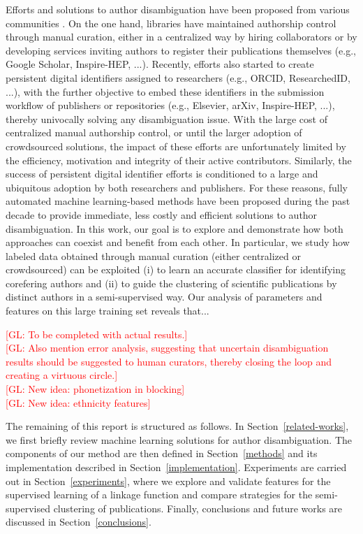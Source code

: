 \documentclass{article}
\newcommand{\glnote}[1]{\textcolor{red}{[GL: #1]}}
\begin{document}
Efforts and solutions to author disambiguation have been proposed from various
communities \citep{liu2014author}. On the one hand, libraries have maintained
authorship control through manual curation, either in a centralized way by
hiring collaborators or by developing services inviting authors to register
their publications themselves (e.g., Google Scholar, Inspire-HEP, ...).
Recently, efforts also started to create persistent digital identifiers
assigned to researchers (e.g., ORCID, ResearchedID, ...), with the further
objective to embed these identifiers in the submission workflow of publishers
or repositories (e.g., Elsevier, arXiv, Inspire-HEP, ...), thereby univocally
solving any disambiguation issue. With the large cost of centralized manual
authorship control, or until the larger adoption of crowdsourced solutions, the
impact of these efforts are unfortunately limited by the efficiency, motivation
and integrity of their active contributors. Similarly, the success of
persistent digital identifier efforts is conditioned to a large and ubiquitous
adoption by both researchers and publishers. For these reasons, fully automated
machine learning-based methods have been proposed during the past decade to
provide immediate, less costly and efficient solutions to author
disambiguation. In this work, our goal is to explore and demonstrate how both
approaches can coexist and benefit from each other.  In particular, we study
how labeled data obtained through manual curation (either centralized or
crowdsourced) can be exploited (i) to learn an accurate classifier for
identifying corefering authors and (ii) to guide the clustering of scientific
publications by distinct authors in a semi-supervised way. Our analysis of parameters
and features on this large training set reveals that...

\glnote{To be completed with actual results.}\\
\glnote{Also mention error analysis, suggesting that
uncertain disambiguation results should be suggested to human curators, thereby
closing the loop and creating a virtuous circle.}\\
\glnote{New idea: phonetization in blocking}\\
\glnote{New idea: ethnicity features}

The remaining of this report is structured as follows. In Section~\ref{related-works},
we first briefly review machine learning solutions for author disambiguation.
The components of our method are then defined in Section~\ref{methods}
and its implementation described in Section~\ref{implementation}. Experiments
are carried out in Section~\ref{experiments}, where we explore and validate
features for the supervised learning of a linkage function and compare
strategies for the semi-supervised clustering of publications.
Finally, conclusions and future works are discussed in Section~\ref{conclusions}.
\end{document}
